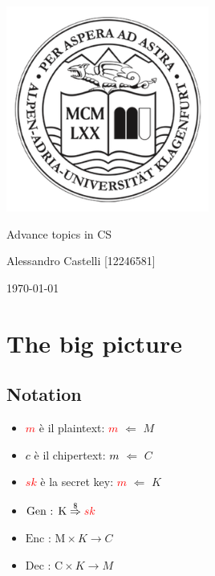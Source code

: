 \documentclass[11pt]{article}
\theoremstyle{definition} \newtheorem{definizione}{Definizione}[section] %
\begin{document}
\begin{titlepage}
    \centering
    \includegraphics[width=0.5\textwidth]{aau.png}
    \vfill
    \begin{center}
        {\LARGE Advance topics in CS \par}
        \vspace{0.5cm}
        {\large Alessandro Castelli [12246581] \par}
        \vspace{0.5cm}
        {\large \today \par}
    \end{center}
    \vfill
\end{titlepage}

\tableofcontents

\newpage


\section{The big picture}
    \subsection{Notation}
    \begin{itemize}
        \item \textcolor{red}{\textbf{$m$}} è il plaintext: \textcolor{red}{\textbf{$m$}} $\Leftarrow$ $M$
        \item \textcolor{black}{\textbf{$c$}} è il chipertext:  \textcolor{black}{\textbf{$m$}} $\Leftarrow$ $C$
        \item \textcolor{red}{\textbf{$sk$}} è la secret key:  \textcolor{red}{\textbf{$m$}} $\Leftarrow$ $K$
    \end{itemize}

    \begin{itemize}
        \item $ \text{Gen : K} \stackrel{\$}{\Rightarrow} \textcolor{red}{sk}$ 
        \item $ \text{Enc : M} \times K \rightarrow C$
        \item $\text{Dec : C} \times K \rightarrow M$
    \end{itemize}
\end{document}
